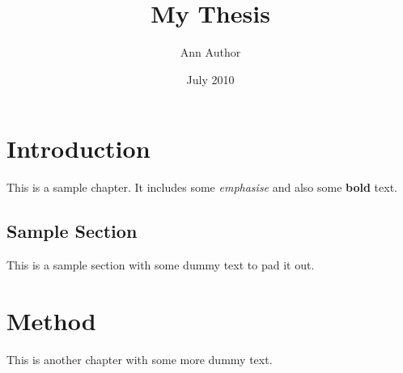 \documentclass{report}
\title{My Thesis}
\author{Ann Author}
\date{July 2010}
\begin{document}
\maketitle

\chapter{Introduction}

This is a sample chapter. It includes some \emph{emphasise}
and also some \textbf{bold} text.

\section{Sample Section}

This is a sample section with some dummy text to pad it out. \lipsum[1]

\chapter{Method}

This is another chapter with some more dummy text. \lipsum[1]
\end{document}

